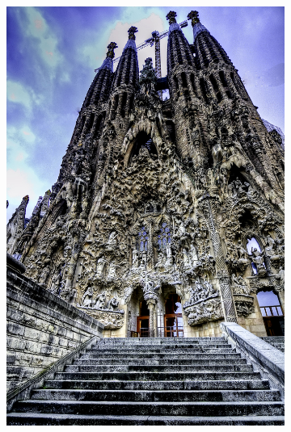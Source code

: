 \documentclass{beamer}
\begin{document}
\begin{frame}
\begin{figure}[t]
\begin{subfigure}[b]{.3\textwidth}
      \includegraphics[width=.9\textwidth]{images/sagrada-familia.jpg}
    \end{subfigure}
    \pause
    \begin{subfigure}[b]{.3\textwidth}

\end{subfigure}
\end{figure}
\end{frame}
\end{document}
